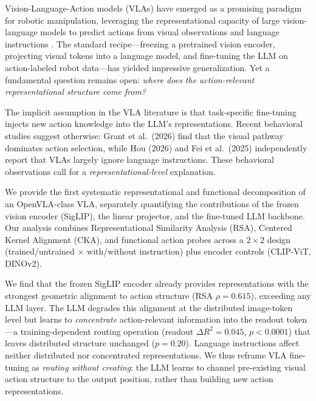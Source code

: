 \documentclass[letterpaper]{article}
\begin{document}
Vision-Language-Action models (VLAs) have emerged as a promising paradigm for robotic manipulation, leveraging the representational capacity of large vision-language models to predict actions from visual observations and language instructions \citep{brohan2023rt2,kim2024openvla,karamcheti2024prismatic}.
The standard recipe---freezing a pretrained vision encoder, projecting visual tokens into a language model, and fine-tuning the LLM on action-labeled robot data---has yielded impressive generalization.
Yet a fundamental question remains open: \emph{where does the action-relevant representational structure come from?}

The implicit assumption in the VLA literature is that task-specific fine-tuning injects new action knowledge into the LLM's representations.
Recent behavioral studies suggest otherwise: Grant et al.\ (2026) find that the visual pathway dominates action selection, while Hou (2026) and Fei et al.\ (2025) independently report that VLAs largely ignore language instructions.
These behavioral observations call for a \emph{representational-level} explanation.

We provide the first systematic representational and functional decomposition of an OpenVLA-class VLA, separately quantifying the contributions of the frozen vision encoder (SigLIP), the linear projector, and the fine-tuned LLM backbone.
Our analysis combines Representational Similarity Analysis (RSA), Centered Kernel Alignment (CKA), and functional action probes across a $2{\times}2$ design (trained/untrained $\times$ with/without instruction) plus encoder controls (CLIP-ViT, DINOv2).

We find that the frozen SigLIP encoder already provides representations with the strongest geometric alignment to action structure (RSA $\rho{=}0.615$), exceeding any LLM layer.
The LLM degrades this alignment at the distributed image-token level but learns to \emph{concentrate} action-relevant information into the readout token---a training-dependent routing operation (readout $\Delta R^2{=}0.045$, $p{<}0.0001$) that leaves distributed structure unchanged ($p{=}0.20$).
Language instructions affect neither distributed nor concentrated representations.
We thus reframe VLA fine-tuning as \emph{routing without creating}: the LLM learns to channel pre-existing visual action structure to the output position, rather than building new action representations.
\end{document}
